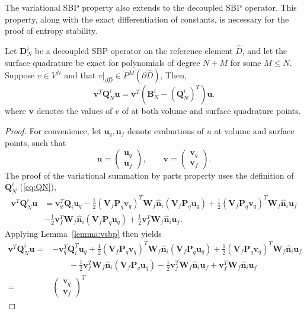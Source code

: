 \documentclass[review]{siamart0216}
\theoremstyle{assumption}
\renewcommand{\hat}[1]{\hat{#1}}
\newcommand{\LRp}[1]{\left( #1 \right)}
\newcommand{\LRl}[1]{\left. #1 \right|}
\renewcommand{\hat}{\widehat}
\begin{document}
The variational SBP property also extends to the decoupled SBP operator.  This property, along with the exact differentiation of constants, is necessary for the proof of entropy stability.  
\begin{lemma}
Let $\bm{D}^i_N$ be a decoupled SBP operator on the reference element $\hat{D}$, and let the surface quadrature be exact for polynomials of degree $N+M$ for some $M \leq N$.  Suppose $v\in V^N$ and that $\LRl{v}_{\partial \hat{D}} \in P^M\LRp{\partial \hat{D}}$, Then, 
\[
\bm{v}^T\bm{Q}^i_N\bm{u} = \bm{v}^T\LRp{\bm{B}^i_N - \LRp{\bm{Q}^i_N}^T}\bm{u}.%
\]
where $\bm{v}$ denotes the values of $v$ of at both volume and surface quadrature points.  
\label{lemma:vdsbp}
\end{lemma}
\begin{proof}
For convenience, let $\bm{u}_q, \bm{u}_f$ denote evaluations of $u$ at volume and surface points, such that 
\[
\bm{u} = \begin{pmatrix} \bm{u}_q\\ \bm{u}_f\end{pmatrix}, \qquad \bm{v} = \begin{pmatrix} \bm{v}_q\\ \bm{v}_f\end{pmatrix}.  
\]
The proof of the variational summation by parts property uses the definition of $\bm{Q}^i_N$ (\ref{eq:QN}), 
\begin{align*}
\bm{v}^T\bm{Q}^i_N\bm{u} &= \bm{v}_q^T\bm{Q}_i \bm{u}_q - \frac{1}{2}\LRp{\bm{V}_f\bm{P}_q\bm{v}_q}^T\bm{W}_f\hat{\bm{n}}_i \LRp{\bm{V}_f\bm{P}_q\bm{u}_q} + \frac{1}{2}\LRp{\bm{V}_f\bm{P}_q\bm{v}_q}^T\bm{W}_f\hat{\bm{n}}_i \bm{u}_f\\
& - \frac{1}{2}\bm{v}_f^T\bm{W}_f\hat{\bm{n}}_i \LRp{\bm{V}_f\bm{P}_q\bm{u}_q} + \frac{1}{2}\bm{v}_f^T\bm{W}_f\hat{\bm{n}}_i \bm{u}_f.
\end{align*}
Applying Lemma~\ref{lemma:vsbp} then yields
\begin{align*}
\bm{v}^T\bm{Q}^i_N\bm{u} =& -\bm{v}_q^T\bm{Q}^T_i \bm{u}_q + \frac{1}{2}\LRp{\bm{V}_f\bm{P}_q\bm{v}_q}^T\bm{W}_f\hat{\bm{n}}_i \LRp{\bm{V}_f\bm{P}_q\bm{u}_q} + \frac{1}{2}\LRp{\bm{V}_f\bm{P}_q\bm{v}_q}^T\bm{W}_f\hat{\bm{n}}_i \bm{u}_f\\
&\qquad - \frac{1}{2}\bm{v}_f^T\bm{W}_f\hat{\bm{n}}_i \LRp{\bm{V}_f\bm{P}_q\bm{u}_q} - \frac{1}{2}\bm{v}_f^T\bm{W}_f\hat{\bm{n}}_i \bm{u}_f + \bm{v}_f^T\bm{W}_f\hat{\bm{n}}_i \bm{u}_f\\
=& \begin{pmatrix} \bm{v}_q\\ \bm{v}_f\end{pmatrix}^T 

\end{align*}
\end{proof}
\end{document}
